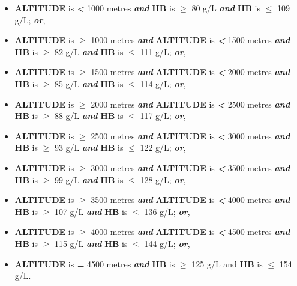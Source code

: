 \documentclass[12pt,a4paper]{article}
\begin{document}
\begin{itemize}
  \begin{itemize}
  \item
    \textbf{ALTITUDE} is \textbf{\emph{\textless{}}} 1000 metres \textbf{\emph{and}} \textbf{HB} is \textbf{\emph{\(\geq\)}} 80 g/L \textbf{\emph{and}} \textbf{HB} is \textbf{\emph{\(\leq\)}} 109 g/L; \textbf{\emph{or}},
  \item
    \textbf{ALTITUDE} is \textbf{\emph{\(\geq\)}} 1000 metres \textbf{\emph{and}} \textbf{ALTITUDE} is \textbf{\emph{\textless{}}} 1500 metres \textbf{\emph{and}} \textbf{HB} is \textbf{\emph{\(\geq\)}} 82 g/L \textbf{\emph{and}} \textbf{HB} is \textbf{\emph{\(\leq\)}} 111 g/L; \textbf{\emph{or}},
  \item
    \textbf{ALTITUDE} is \textbf{\emph{\(\geq\)}} 1500 metres \textbf{\emph{and}} \textbf{ALTITUDE} is \textbf{\emph{\textless{}}} 2000 metres \textbf{\emph{and}} \textbf{HB} is \textbf{\emph{\(\geq\)}} 85 g/L \textbf{\emph{and}} \textbf{HB} is \textbf{\emph{\(\leq\)}} 114 g/L; \textbf{\emph{or}},
  \item
    \textbf{ALTITUDE} is \textbf{\emph{\(\geq\)}} 2000 metres \textbf{\emph{and}} \textbf{ALTITUDE} is \textbf{\emph{\textless{}}} 2500 metres \textbf{\emph{and}} \textbf{HB} is \textbf{\emph{\(\geq\)}} 88 g/L \textbf{\emph{and}} \textbf{HB} is \textbf{\emph{\(\leq\)}} 117 g/L; \textbf{\emph{or}},
  \item
    \textbf{ALTITUDE} is \textbf{\emph{\(\geq\)}} 2500 metres \textbf{\emph{and}} \textbf{ALTITUDE} is \textbf{\emph{\textless{}}} 3000 metres \textbf{\emph{and}} \textbf{HB} is \textbf{\emph{\(\geq\)}} 93 g/L \textbf{\emph{and}} \textbf{HB} is \textbf{\emph{\(\leq\)}} 122 g/L; \textbf{\emph{or}},
  \item
    \textbf{ALTITUDE} is \textbf{\emph{\(\geq\)}} 3000 metres \textbf{\emph{and}} \textbf{ALTITUDE} is \textbf{\emph{\textless{}}} 3500 metres \textbf{\emph{and}} \textbf{HB} is \textbf{\emph{\(\geq\)}} 99 g/L \textbf{\emph{and}} \textbf{HB} is \textbf{\emph{\(\leq\)}} 128 g/L; \textbf{\emph{or}},
  \item
    \textbf{ALTITUDE} is \textbf{\emph{\(\geq\)}} 3500 metres \textbf{\emph{and}} \textbf{ALTITUDE} is \textbf{\emph{\textless{}}} 4000 metres \textbf{\emph{and}} \textbf{HB} is \textbf{\emph{\(\geq\)}} 107 g/L \textbf{\emph{and}} \textbf{HB} is \textbf{\emph{\(\leq\)}} 136 g/L; \textbf{\emph{or}},
  \item
    \textbf{ALTITUDE} is \textbf{\emph{\(\geq\)}} 4000 metres \textbf{\emph{and}} \textbf{ALTITUDE} is \textbf{\emph{\textless{}}} 4500 metres \textbf{\emph{and}} \textbf{HB} is \textbf{\emph{\(\geq\)}} 115 g/L \textbf{\emph{and}} \textbf{HB} is \textbf{\emph{\(\leq\)}} 144 g/L; \textbf{\emph{or}},
  \item
    \textbf{ALTITUDE} is \textbf{\emph{=}} 4500 metres \textbf{\emph{and}} \textbf{HB} is \textbf{\emph{\(\geq\)}} 125 g/L and \textbf{HB} is \textbf{\emph{\(\leq\)}} 154 g/L.
  \end{itemize}
\end{itemize}
\end{document}
